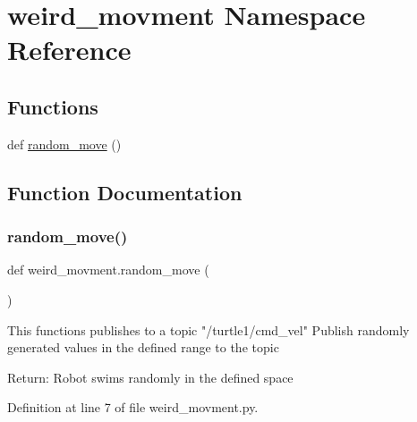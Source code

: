 \hypertarget{namespaceweird__movment}{}\section{weird\+\_\+movment Namespace Reference}
\label{namespaceweird__movment}
\subsection*{Functions}
\begin{DoxyCompactItemize}
\item 
def \hyperlink{namespaceweird__movment_af9fdd9cf7ec9433ef05e564066254d07}{random\+\_\+move} ()
\end{DoxyCompactItemize}


\subsection{Function Documentation}
\mbox{\label{namespaceweird__movment_af9fdd9cf7ec9433ef05e564066254d07}} 
\subsubsection{\texorpdfstring{random\+\_\+move()}{random\_move()}}
{\footnotesize\ttfamily def weird\+\_\+movment.\+random\+\_\+move (\begin{DoxyParamCaption}{ }\end{DoxyParamCaption})}

\begin{DoxyVerb}This functions publishes to a topic "/turtle1/cmd_vel"
Publish randomly generated values in the defined range to the topic 

Return:
Robot swims randomly in the defined space
\end{DoxyVerb}
 

Definition at line 7 of file weird\+\_\+movment.\+py.

